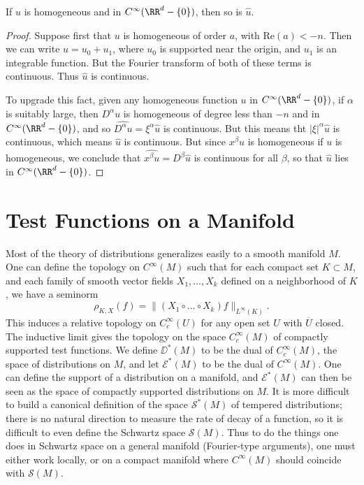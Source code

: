 \begin{lemma}
    If $u$ is homogeneous and in $C^\infty(\RR^d - \{ 0 \})$, then so is $\widehat{u}$.
\end{lemma}
\begin{proof}
    Suppose first that $u$ is homogeneous of order $a$, with $\text{Re}(a) < -n$. Then we can write $u = u_0 + u_1$, where $u_0$ is supported near the origin, and $u_1$ is an integrable function. But the Fourier transform of both of these terms is continuous. Thus $\widehat{u}$ is continuous.

    To upgrade this fact, given any homogeneous function $u$ in $C^\infty(\RR^d - \{ 0 \})$, if $\alpha$ is suitably large, then $D^\alpha u$ is homogeneous of degree less than $-n$ and in $C^\infty(\RR^d - \{ 0 \})$, and so $\widehat{D^\alpha u} = \xi^\alpha \widehat{u}$ is continuous. But this means tht $|\xi|^\alpha \widehat{u}$ is continuous, which means $\widehat{u}$ is continuous. But since $x^\beta u$ is homogeneous if $u$ is homogeneous, we conclude that $\widehat{x^\beta u} = D^\beta \widehat{u}$ is continuous for all $\beta$, so that $\widehat{u}$ lies in $C^\infty(\RR^d - \{ 0 \})$.
\end{proof}



\section{Test Functions on a Manifold}

Most of the theory of distributions generalizes easily to a smooth manifold $M$. One can define the topology on $C^\infty(M)$ such that for each compact set $K \subset M$, and each family of smooth vector fields $X_1,\dots,X_k$ defined on a neighborhood of $K$, we have a seminorm
%
\[ \rho_{K,X}(f) = \| (X_1 \circ \dots \circ X_k) f \|_{L^\infty(K)}. \]
%
This induces a relative topology on $C_c^\infty(U)$ for any open set $U$ with $\overline{U}$ closed. The inductive limit gives the topology on the space $C_c^\infty(M)$ of compactly supported test functions. We define $\DD^*(M)$ to be the dual of $C_c^\infty(M)$, the space of distributions on $M$, and let $\mathcal{E}^*(M)$ to be the dual of $C^\infty(M)$. One can define the support of a distribution on a manifold, and $\mathcal{E}^*(M)$ can then be seen as the space of compactly supported distributions on $M$. It is more difficult to build a canonical definition of the space $\mathcal{S}^*(M)$ of tempered distributions; there is no natural direction to measure the rate of decay of a function, so it is difficult to even define the Schwartz space $\mathcal{S}(M)$. Thus to do the things one does in Schwartz space on a general manifold (Fourier-type arguments), one must either work locally, or on a compact manifold where $C^\infty(M)$ should coincide with $\mathcal{S}(M)$.

